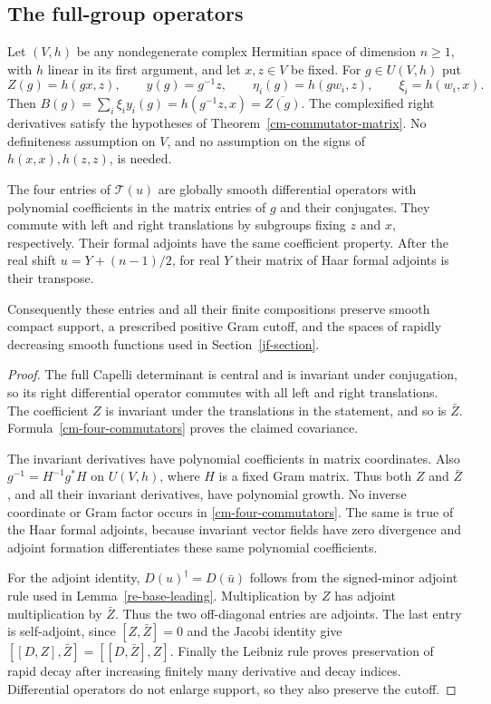 \subsection{The full-group operators}

Let $(V,h)$ be any nondegenerate complex Hermitian space of dimension
$n\geq1$, with $h$ linear in its first argument, and let $x,z\in V$
be fixed.
For $g\in U(V,h)$ put
\[
 Z(g)=h(gx,z),\qquad
 y(g)=g^{-1}z,\qquad
 \eta_i(g)=h(gw_i,z),\qquad \xi_i=h(w_i,x).
\]
Then $B(g)=\sum_i\xi_i y_i(g)=h(g^{-1}z,x)=\overline{Z(g)}$.
The complexified right derivatives satisfy the hypotheses of
Theorem~\ref{cm-commutator-matrix}.  No definiteness assumption
on $V$, and no assumption on the signs of $h(x,x),h(z,z)$, is needed.

\begin{corollary}\label{cm-group-preservation}
The four entries of $\mathcal T(u)$ are globally smooth differential
operators with polynomial coefficients in the matrix entries of $g$
and their conjugates.  They commute with left and right translations
by subgroups fixing $z$ and $x$, respectively.  Their formal adjoints
have the same coefficient property.  After the real shift
$u=Y+(n-1)/2$, for real $Y$ their matrix of Haar formal adjoints
is their transpose.

Consequently these entries and all their finite compositions preserve
smooth compact support, a prescribed positive Gram cutoff, and the
spaces of rapidly decreasing smooth functions used in
Section~\ref{jf-section}.
\end{corollary}

\begin{proof}
The full Capelli determinant is central and is invariant under
conjugation, so its right differential operator commutes with all
left and right translations.  The coefficient $Z$ is invariant
under the translations in the statement, and so is $\bar Z$.
Formula~\eqref{cm-four-commutators} proves the claimed covariance.

The invariant derivatives have polynomial coefficients in matrix
coordinates.  Also $g^{-1}=H^{-1}g^*H$ on $U(V,h)$, where $H$
is a fixed Gram matrix.  Thus both $Z$ and $\bar Z$, and all
their invariant derivatives, have polynomial growth.  No inverse
coordinate or Gram factor occurs in \eqref{cm-four-commutators}.
The same is true of the Haar formal adjoints, because invariant
vector fields have zero divergence and adjoint formation differentiates
these same polynomial coefficients.

For the adjoint identity, $D(u)^\dagger=D(\bar u)$ follows from
the signed-minor adjoint rule used in Lemma~\ref{re-base-leading}.
Multiplication by $Z$ has adjoint multiplication by $\bar Z$.
Thus the two off-diagonal entries are adjoints.  The last entry
is self-adjoint, since $[Z,\bar Z]=0$ and the Jacobi identity give
$[[D,Z],\bar Z]=[[D,\bar Z],Z]$.
Finally the Leibniz rule proves preservation of rapid decay after
increasing finitely many derivative and decay indices.  Differential
operators do not enlarge support, so they also preserve the cutoff.
\end{proof}

